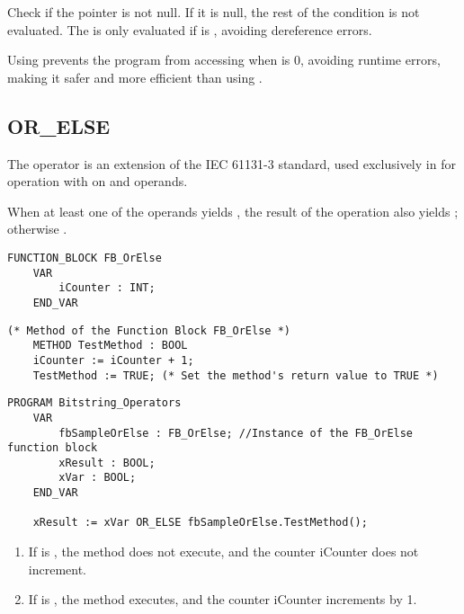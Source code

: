 	Check if the pointer  is not null. If it is null, the rest of the condition is not evaluated.
	 The  is only evaluated if  is , avoiding dereference errors.

Using  prevents the program from accessing  when  is 0, avoiding runtime errors, making it safer and more efficient than using .
\subsection{OR\_ELSE} 
The operator is an extension of the IEC 61131-3 standard, used
exclusively in  for  operation with 
on  and  operands.

When at least one of the operands yields , the result of the operation also yields ; otherwise .

\begin{lstlisting}[language=ST ]
	FUNCTION_BLOCK FB_OrElse
	VAR
		iCounter : INT;
	END_VAR
\end{lstlisting} 
\begin{lstlisting}[language=ST ]	
	(* Method of the Function Block FB_OrElse *)
	METHOD TestMethod : BOOL
	iCounter := iCounter + 1;
	TestMethod := TRUE; (* Set the method's return value to TRUE *)
\end{lstlisting} 

\begin{lstlisting}[language=ST ]
	PROGRAM Bitstring_Operators
	VAR 
		fbSampleOrElse : FB_OrElse; //Instance of the FB_OrElse function block 
		xResult : BOOL;
		xVar : BOOL;
	END_VAR
	
	xResult := xVar OR_ELSE fbSampleOrElse.TestMethod();
\end{lstlisting} 

\begin{enumerate}
	\item If  is , the method does not execute, and the counter iCounter does not increment.
	\item If  is , the method executes, and the counter iCounter increments by 1.
\end{enumerate}

